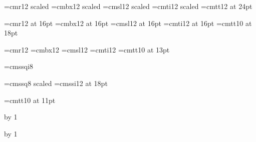 
\newcount\sectionno{}
\newcount\subsectionno{}
\newcount\subsubsectionno{}
\newcount\subsubsubsectionno{}
\newcount\topicno{}

\font\titlerm=cmr12  scaled   \font\titlebf=cmbx12 scaled 
\font\titlesl=cmsl12 scaled   \font\titleit=cmti12 scaled 
\font\titlett=cmtt12 at 24pt

\font\sectionrm=cmr12  at 16pt         \font\sectionbf=cmbx12 at 16pt
\font\sectionsl=cmsl12 at 16pt         \font\sectionit=cmti12 at 16pt
\font\sectiontt=cmtt10 at 18pt

\font\subsectionrm=cmr12               \font\subsectionbf=cmbx12
\font\subsectionsl=cmsl12              \font\subsectionit=cmti12
\font\subsectiontt=cmtt10 at 13pt

\font\quoterm=cmssqi8

\font\bigbf=cmssq8 scaled 
\font\bigit=cmssi12 at 18pt

\font\bodytt=cmtt10 at 11pt
\def\tt{\fam\ttfam\bodytt}

%
%

\def\title#1\par{{
    \let\rm\titlerm\let\bf\titlebf
    \let\tt\titlett
    \let\it\titleit
    \let\sl\titlesl\rm
    {}}\bigskip}

\def\section#1\par{
    \advance\sectionno by 1
    \vsize{}
    \vsize{}
    \bigskip
    {\let\rm\sectionrm\let\bf\sectionbf
    \let\tt\sectiontt\let\it\sectionit
    \let\sl\sectionsl

\rm{}}
    \nobreak\smallskip\noindent}

\def\subsection#1\par{
    \advance\subsectionno by 1
    \vsize{}
    \vsize{}
    \bigskip
    {\let\rm\subsectionrm\let\bf\subsectionbf
    \let\tt\subsectiontt\let\it\subsectionit
    \let\sl\subsectionsl
    \rm{}}
    \nobreak\smallskip\noindent}

